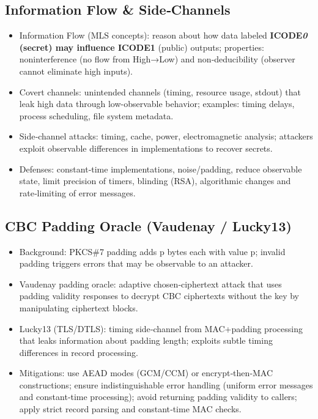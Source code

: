 \documentclass{article}
\begin{document}
\subsection{Information Flow \& Side‑Channels}
\begin{itemize}
  \item Information Flow (MLS concepts): reason about how data labeled \textbf{ICODE\textit{0} (secret) may influence \textbf{ICODE}1} (public) outputs; properties: noninterference (no flow from High→Low) and non‑deducibility (observer cannot eliminate high inputs).
  \item Covert channels: unintended channels (timing, resource usage, stdout) that leak high data through low-observable behavior; examples: timing delays, process scheduling, file system metadata.
  \item Side‑channel attacks: timing, cache, power, electromagnetic analysis; attackers exploit observable differences in implementations to recover secrets.
  \item Defenses: constant‑time implementations, noise/padding, reduce observable state, limit precision of timers, blinding (RSA), algorithmic changes and rate‑limiting of error messages.
\end{itemize}

\subsection{CBC Padding Oracle (Vaudenay / Lucky13)}
\begin{itemize}
  \item Background: PKCS\#7 padding adds p bytes each with value p; invalid padding triggers errors that may be observable to an attacker.
  \item Vaudenay padding oracle: adaptive chosen‑ciphertext attack that uses padding validity responses to decrypt CBC ciphertexts without the key by manipulating ciphertext blocks.
  \item Lucky13 (TLS/DTLS): timing side‑channel from MAC+padding processing that leaks information about padding length; exploits subtle timing differences in record processing.
  \item Mitigations: use AEAD modes (GCM/CCM) or encrypt‑then‑MAC constructions; ensure indistinguishable error handling (uniform error messages and constant‑time processing); avoid returning padding validity to callers; apply strict record parsing and constant‑time MAC checks.
\end{itemize}
\end{document}
